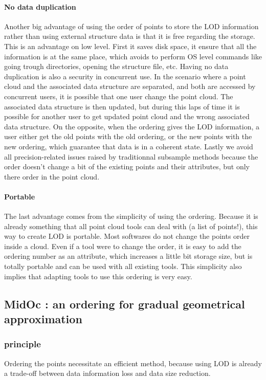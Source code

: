			\paragraph{No data duplication}
				Another big advantage of using the order of points to store the LOD information rather than using external structure data is that it is free regarding the storage.
				This is an advantage on low level. First it saves disk space, it ensure that all the information is at the same place, which avoids to perform OS level commands like going trough directories, opening the structure file, etc.
				Having no data duplication is also a security in concurrent use.
				In the scenario where a point cloud and the associated data structure are separated, and both are accessed by concurrent users, it is possible that one user change the point cloud. The associated data structure is then updated, but during this laps of time it is possible for another user to get updated point cloud and the wrong associated data structure.  
				On the opposite, when the ordering gives the LOD information, a user either get the old points with the old ordering, or the new points with the new ordering, which guarantee that data is in a coherent state.
				Lastly we avoid all precision-related issues raised by traditionnal subsample methods because the order doesn't change a bit of the existing points and their attributes, but only there order in the point cloud.
			\paragraph{Portable}
				The last advantage comes from the simplicity of using the ordering. 
				Because it is already something that all point cloud tools can deal with (a list of points!), this way to create LOD is portable. Most softwares do not change the points order inside a cloud.
				Even if a tool were to change the order, it is easy to add the ordering number as an attribute, which increases a little bit storage size, but is totally portable and can be used with all existing tools.
				This simplicity also implies that adapting tools to use this ordering is very easy.
	
	\subsection{ \label{subsec:midoc} MidOc : an ordering for gradual geometrical approximation}
		\subsubsection{principle}
			Ordering the points necessitate an efficient method, because using LOD is already a trade-off between data information loss and data size reduction.
			
